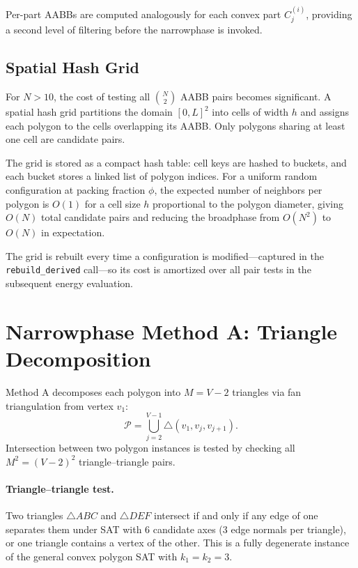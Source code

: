 Per-part AABBs are computed analogously for each convex part $C_j^{(i)}$,
providing a second level of filtering before the narrowphase is invoked.

\subsection{Spatial Hash Grid}

For $N > 10$, the cost of testing all $\binom{N}{2}$ AABB pairs
becomes significant. A spatial hash grid partitions the domain
$[0, L]^2$ into cells of width $h$ and assigns each polygon to the
cells overlapping its AABB. Only polygons sharing at least one cell
are candidate pairs.

The grid is stored as a compact hash table: cell keys are hashed to
buckets, and each bucket stores a linked list of polygon indices.
For a uniform random configuration at packing fraction $\phi$, the
expected number of neighbors per polygon is $O(1)$ for a cell size
$h$ proportional to the polygon diameter, giving $O(N)$ total candidate
pairs and reducing the broadphase from $O(N^2)$ to $O(N)$ in expectation.

The grid is rebuilt every time a configuration is modified---captured
in the \texttt{rebuild\_derived} call---so its cost is amortized over
all pair tests in the subsequent energy evaluation.

\section{Narrowphase Method A: Triangle Decomposition}
\label{sec:method-a}

Method A decomposes each polygon into $M = V - 2$ triangles via fan
triangulation from vertex $v_1$:
\[
  \mathcal{P} = \bigcup_{j=2}^{V-1} \triangle(v_1, v_j, v_{j+1}).
\]
Intersection between two polygon instances is tested by checking all
$M^2 = (V-2)^2$ triangle--triangle pairs.

\paragraph{Triangle--triangle test.}
Two triangles $\triangle ABC$ and $\triangle DEF$ intersect if and only
if any edge of one separates them under SAT with 6 candidate axes
(3 edge normals per triangle), or one triangle contains a vertex of
the other. This is a fully degenerate instance of the general convex
polygon SAT with $k_1 = k_2 = 3$.

